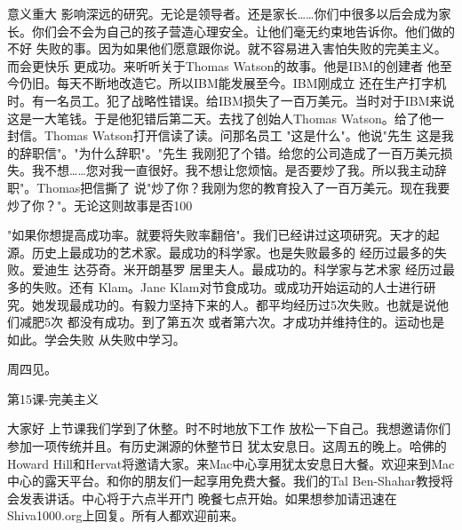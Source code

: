 意义重大 影响深远的研究。无论是领导者。还是家长……你们中很多以后会成为家长。你们会不会为自己的孩子营造心理安全。让他们毫无约束地告诉你。他们做的不好 失败的事。因为如果他们愿意跟你说。就不容易进入害怕失败的完美主义。而会更快乐 更成功。来听听关于Thomas Watson的故事。他是IBM的创建者 他至今仍旧。每天不断地改造它。所以IBM能发展至今。IBM刚成立 还在生产打字机时。有一名员工。犯了战略性错误。给IBM损失了一百万美元。当时对于IBM来说这是一大笔钱。于是他犯错后第二天。去找了创始人Thomas Watson。给了他一封信。Thomas Watson打开信读了读。问那名员工 "这是什么"。他说"先生 这是我的辞职信"。"为什么辞职"。"先生 我刚犯了个错。给您的公司造成了一百万美元损失。我不想……您对我一直很好。我不想让您烦恼。是否要炒了我。所以我主动辞职"。Thomas把信撕了 说"炒了你？我刚为您的教育投入了一百万美元。现在我要炒了你？"。无论这则故事是否100%

"如果你想提高成功率。就要将失败率翻倍"。我们已经讲过这项研究。天才的起源。历史上最成功的艺术家。最成功的科学家。也是失败最多的 经历过最多的失败。爱迪生 达芬奇。米开朗基罗 居里夫人。最成功的。科学家与艺术家 经历过最多的失败。还有 Klam。Jane Klam对节食成功。或成功开始运动的人士进行研究。她发现最成功的。有毅力坚持下来的人。都平均经历过5次失败。也就是说他们减肥5次 都没有成功。到了第五次 或者第六次。才成功并维持住的。运动也是如此。学会失败 从失败中学习。 

周四见。 

第15课-完美主义 

大家好 上节课我们学到了休整。时不时地放下工作 放松一下自己。我想邀请你们参加一项传统并且。有历史渊源的休整节日 犹太安息日。这周五的晚上。哈佛的Howard Hill和Hervat将邀请大家。来Mac中心享用犹太安息日大餐。欢迎来到Mac中心的露天平台。和你的朋友们一起享用免费大餐。我们的Tal Ben-Shahar教授将会发表讲话。中心将于六点半开门 晚餐七点开始。如果想参加请迅速在Shiva1000.org上回复。所有人都欢迎前来。 

